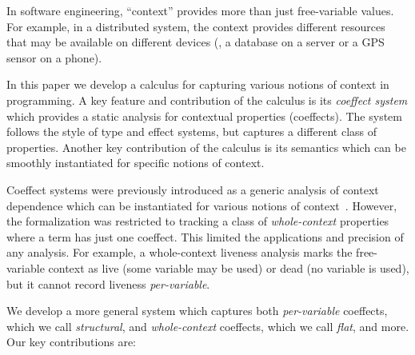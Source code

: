 In software engineering, ``context'' provides more than just free-variable values. For example, in a
distributed system, the context provides different resources that may be available on different 
devices (\eg{}, a database on a server or a GPS sensor on a phone).

In this paper we develop a calculus for capturing various notions of 
context in programming. A key feature and contribution
of the calculus is its \emph{coeffect system} which provides a static analysis for contextual properties (coeffects). The system
follows the style of type and effect systems, but captures a different class of properties. %
Another key contribution of the calculus is its semantics which can be smoothly instantiated for specific notions of context.

Coeffect systems were previously introduced as a generic analysis of
context dependence which can be instantiated for various notions of
context~\cite{petricek2013coeffects}. However, the formalization was restricted to
tracking a class of \emph{whole-context} properties where a term has just
one coeffect. This limited the applications and precision of any
analysis. For example, a whole-context liveness analysis marks the 
free-variable context as live (some variable may be used) or dead 
(no variable is used), but it cannot record liveness \emph{per-variable}. 

We develop a more general system which captures both
\emph{per-variable} coeffects, which we call \emph{structural}, and
\emph{whole-context} coeffects, which we call \emph{flat}, and more. Our
key contributions are:

